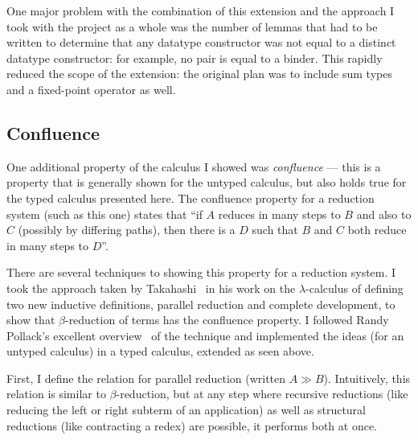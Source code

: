 One major problem with the combination of this extension and the approach I took with the project as a whole was the number of lemmas that had to be written to determine that any datatype constructor was not equal to a distinct datatype constructor: for example, no pair is equal to a binder.
This rapidly reduced the scope of the extension: the original plan was to include sum types and a fixed-point operator as well.

\subsection{Confluence}
One additional property of the calculus I showed was \emph{confluence} --- this is a property that is generally shown for the untyped calculus, but also holds true for the typed calculus presented here.
The confluence property for a reduction system (such as this one) states that ``if \(A\) reduces in many steps to \(B\) and also to \(C\) (possibly by differing paths), then there is a \(D\) such that \(B\) and \(C\) both reduce in many steps to \(D\)''.

There are several techniques to showing this property for a reduction system.
I took the approach taken by Takahashi~\cite{Takahashi} in his work on the \(\lambda\)-calculus of defining two new inductive definitions, parallel reduction and complete development, to show that \(\beta\)-reduction of terms has the confluence property.
I followed Randy Pollack's excellent overview~\cite{pollack} of the technique and implemented the ideas (for an untyped calculus) in a typed calculus, extended as seen above.

First, I define the relation for parallel reduction (written \(A \gg B\)).
Intuitively, this relation is similar to \(\beta\)-reduction, but at any step where recursive reductions (like reducing the left or right subterm of an application) as well as structural reductions (like contracting a redex) are possible, it performs both at once.

